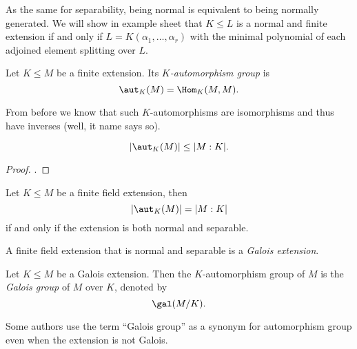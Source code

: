 \documentclass[a4paper]{article}
\begin{document}
\begin{remark}
  As the same for separability, being normal is equivalent to being normally generated. We will show in example sheet that \(K \leq L\) is a normal and finite extension if and only if \(L = K(\alpha_1, \dots, \alpha_r)\) with the minimal polynomial of each adjoined element splitting over \(L\).
\end{remark}

\begin{definition}
  Let \(K \leq M\) be a finite extension. Its \emph{\(K\)-automorphism group} is
  \[
    \aut_K(M) = \Hom_K(M, M).
  \]
\end{definition}

From before we know that such \(K\)-automorphisms are isomorphisms and thus have inverses (well, it name says so).

\begin{lemma}
  \[
    |\aut_K(M)| \leq |M:K|.
  \]
\end{lemma}

\begin{proof}
  .
\end{proof}

\begin{theorem}
  \label{thm:galois criterion}
  Let \(K \leq M\) be a finite field extension, then
  \[
    |\aut_K(M)| = |M:K|
  \]
  if and only if the extension is both normal and separable.
\end{theorem}

\begin{definition}
  A finite field extension that is normal and separable is a \emph{Galois extension}.
\end{definition}

\begin{definition}
  Let \(K \leq M\) be a Galois extension. Then the \(K\)-automorphism group of \(M\) is the \emph{Galois group} of \(M\) over \(K\), denoted by
  \[
    \gal(M/K).
  \]
\end{definition}

\begin{remark}
  Some authors use the term ``Galois group'' as a synonym for automorphism group even when the extension is not Galois.
\end{remark}
\end{document}
